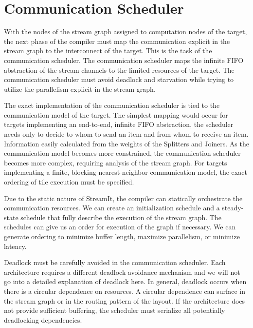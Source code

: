 \section{Communication Scheduler}
\label{sec:communic}

With the nodes of the stream graph assigned to computation nodes of
the target, the next phase of the compiler must map the communication
explicit in the stream graph to the interconnect of the target.  This
is the task of the communication scheduler.  The communication
scheduler maps the infinite FIFO abstraction of the stream channels to
the limited resources of the target.  The communication scheduler must
avoid deadlock and starvation while trying to utilize the parallelism
explicit in the stream graph.

The exact implementation of the communication scheduler is tied to the
communication model of the target.  The simplest mapping would occur
for targets implementing an end-to-end, infinite FIFO abstraction, the
scheduler needs only to decide to whom to send an item and from whom
to receive an item.  Information easily calculated from the weights of
the Splitters and Joiners.  As the communication model becomes more
constrained, the communication scheduler becomes more complex,
requiring analysis of the stream graph. For targets implementing a
finite, blocking nearest-neighbor communication model, the exact
ordering of tile execution must be specified. 

Due to the static nature of StreamIt, the compiler can statically
orchestrate the communication resources.  We can create an
initialization schedule and a steady-state schedule that fully
describe the execution of the stream graph.  The schedules can give us
an order for execution of the graph if necessary.  We can generate
ordering to minimize buffer length, maximize parallelism, or minimize
latency.  


Deadlock must be carefully avoided in the communication
scheduler. Each architecture requires a different deadlock avoidance
mechanism and we will not go into a detailed explanation of deadlock
here.  In general, deadlock occurs when there is a circular dependence
on resources.  A circular dependence can surface in the stream graph
or in the routing pattern of the layout.  If the architecture does not
provide sufficient buffering, the scheduler must serialize all
potentially deadlocking dependencies.

